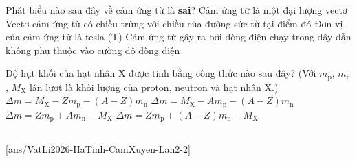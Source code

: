 	\begin{ex}%
		Phát biểu nào sau đây về cảm ứng từ là \textbf{sai}?
		\choice
		{Cảm ứng từ là một đại lượng vectơ}
		{Vectơ cảm ứng từ có chiều trùng với chiều của đường sức từ tại điểm đó}
		{Đơn vị của cảm ứng từ là tesla (T)}
		{\True Cảm ứng từ gây ra bởi dòng điện chạy trong dây dẫn không phụ thuộc vào cường độ dòng điện}
	\end{ex}

	\begin{ex}%
		Độ hụt khối của hạt nhân X được tính bằng công thức nào sau đây? (Với $m_\text{p}$, $m_\text{n}$, $M_\text{X}$ lần lượt là khối lượng của proton, neutron và hạt nhân X.)
		\choice
		{$\Delta m=M_\text{X}-Zm_\text{p}-(A-Z)m_\text{n}$}
		{$\Delta m=M_\text{X}-Am_\text{p}-(A-Z)m_\text{n}$}
		{$\Delta m=Zm_\text{p}+Am_\text{n}-M_\text{X}$}
		{\True $\Delta m=Zm_\text{p}+(A-Z)m_\text{n}-M_\text{X}$}
	\end{ex}

	\subsection*{}
	\setcounter{ex}{0}
	[ans/VatLi2026-HaTinh-CamXuyen-Lan2-2]

